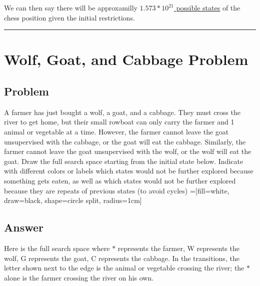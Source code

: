 \documentclass[11pt]{article}
\begin{document}
\begin{flushleft}
We can then say there will be approxamilly \ul{$1.573 * 10^{21}$ possible
states} of the chess position given the initial restrictions.


\hspace{1cm}
\hrule
\section*{Wolf, Goat, and Cabbage Problem}

\subsection*{Problem}
A farmer has just bought a wolf, a goat, and a cabbage. They must cross the
river to get home, but their small rowboat can only carry the farmer and 1
animal or vegetable at a time. However, the farmer cannot leave the goat
unsupervised with the cabbage, or the goat will eat the cabbage. Similarly,
the farmer cannot leave the goat unsupervised with the wolf, or the wolf
will eat the goat. Draw the full search space starting from the initial
state below. Indicate with different colors or labels which states would
not be further explored because something gets eaten, as well as which
states would not be further explored because they are repeats of previous
states (to avoid cycles)
=[fill=white, draw=black, shape=circle split, radius=1cm]

\begin{center}
\end{center}


\subsection*{Answer}

Here is the full search space where $*$ represents the farmer, W represents the
wolf, G represents the goat, C represents the cabbage. In the transitions, the
letter shown next to the edge is the animal or vegetable crossing the river; the
$*$ alone is the farmer crossing the river on his own.


\end{flushleft}
\end{document}
